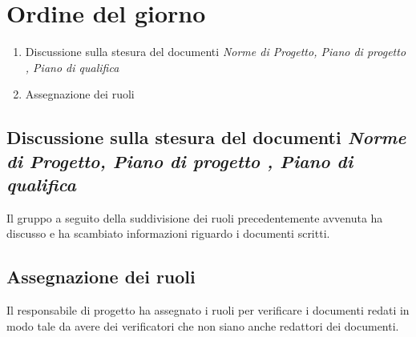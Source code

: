 \section{Ordine del giorno}
\begin{enumerate}
\item Discussione sulla stesura del documenti \textit{Norme di Progetto, Piano di progetto , Piano di qualifica} 
\item Assegnazione dei ruoli 
\end{enumerate}

\subsection{Discussione sulla stesura del documenti \textit{Norme di Progetto, Piano di progetto , Piano di qualifica} }
Il gruppo a seguito della suddivisione dei ruoli precedentemente avvenuta ha discusso e ha scambiato informazioni riguardo i documenti scritti. 

\subsection{Assegnazione dei ruoli}
Il responsabile di progetto ha assegnato i ruoli per verificare i documenti redati in modo tale da avere dei verificatori che non siano anche redattori dei documenti.

